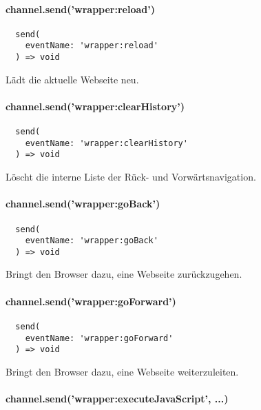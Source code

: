 
\paragraph{channel.send('wrapper:reload')}

\begin{verbatim}
  send(
    eventName: 'wrapper:reload'
  ) => void
\end{verbatim}

Lädt die aktuelle Webseite neu.


\paragraph{channel.send('wrapper:clearHistory')}

\begin{verbatim}
  send(
    eventName: 'wrapper:clearHistory'
  ) => void
\end{verbatim}

Löscht die interne Liste der Rück- und Vorwärtsnavigation.


\paragraph{channel.send('wrapper:goBack')}

\begin{verbatim}
  send(
    eventName: 'wrapper:goBack'
  ) => void
\end{verbatim}

Bringt den Browser dazu, eine Webseite zurückzugehen.


\newpage

\paragraph{channel.send('wrapper:goForward')}

\begin{verbatim}
  send(
    eventName: 'wrapper:goForward'
  ) => void
\end{verbatim}

Bringt den Browser dazu, eine Webseite weiterzuleiten.


\paragraph{channel.send('wrapper:executeJavaScript', ...)}

